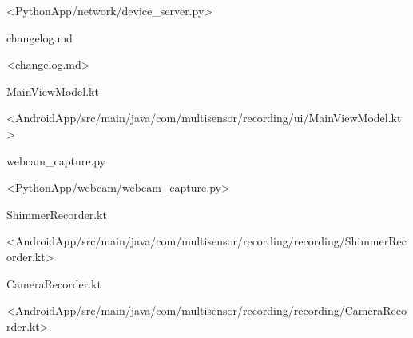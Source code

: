 <PythonApp/network/device_server.py>

\cite{ref16}
\cite{ref17}
changelog.md

<changelog.md>

\cite{ref36}
\cite{ref37}
MainViewModel.kt

<AndroidApp/src/main/java/com/multisensor/recording/ui/MainViewModel.kt>

\cite{ref41}
\cite{ref42}
webcam_capture.py

<PythonApp/webcam/webcam_capture.py>

\cite{ref44}
\cite{ref45}
\cite{ref66}
ShimmerRecorder.kt

<AndroidApp/src/main/java/com/multisensor/recording/recording/ShimmerRecorder.kt>

\cite{ref63}
\cite{ref64}
CameraRecorder.kt

<AndroidApp/src/main/java/com/multisensor/recording/recording/CameraRecorder.kt>
